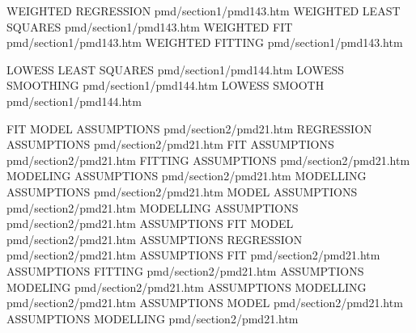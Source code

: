 WEIGHTED REGRESSION                     pmd/section1/pmd143.htm
WEIGHTED LEAST SQUARES                  pmd/section1/pmd143.htm
WEIGHTED FIT                            pmd/section1/pmd143.htm
WEIGHTED FITTING                        pmd/section1/pmd143.htm

LOWESS LEAST SQUARES                    pmd/section1/pmd144.htm
LOWESS SMOOTHING                        pmd/section1/pmd144.htm
LOWESS SMOOTH                           pmd/section1/pmd144.htm

FIT MODEL ASSUMPTIONS                   pmd/section2/pmd21.htm
REGRESSION ASSUMPTIONS                  pmd/section2/pmd21.htm
FIT ASSUMPTIONS                         pmd/section2/pmd21.htm
FITTING ASSUMPTIONS                     pmd/section2/pmd21.htm
MODELING ASSUMPTIONS                    pmd/section2/pmd21.htm
MODELLING ASSUMPTIONS                   pmd/section2/pmd21.htm
MODEL ASSUMPTIONS                       pmd/section2/pmd21.htm
MODELLING ASSUMPTIONS                   pmd/section2/pmd21.htm
ASSUMPTIONS FIT MODEL                   pmd/section2/pmd21.htm
ASSUMPTIONS REGRESSION                  pmd/section2/pmd21.htm
ASSUMPTIONS FIT                         pmd/section2/pmd21.htm
ASSUMPTIONS FITTING                     pmd/section2/pmd21.htm
ASSUMPTIONS MODELING                    pmd/section2/pmd21.htm
ASSUMPTIONS MODELLING                   pmd/section2/pmd21.htm
ASSUMPTIONS MODEL                       pmd/section2/pmd21.htm
ASSUMPTIONS MODELLING                   pmd/section2/pmd21.htm

